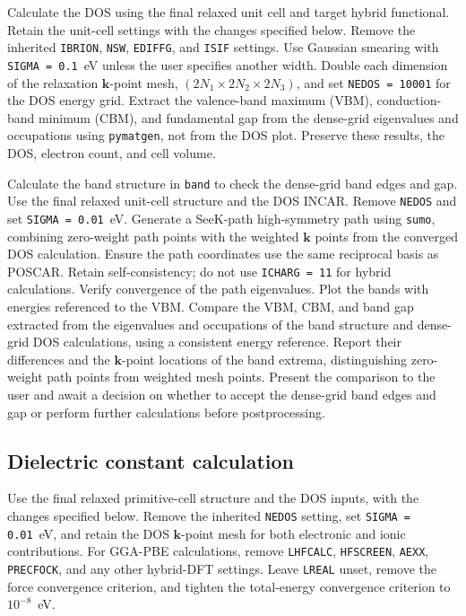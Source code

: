 \documentclass[aip,jap,reprint,amsmath,amssymb]{revtex4-2}
\begin{document}
Calculate the DOS using the final relaxed unit cell and target hybrid functional. Retain the unit-cell settings with the changes specified below. Remove the inherited \texttt{IBRION}, \texttt{NSW}, \texttt{EDIFFG}, and \texttt{ISIF} settings. Use Gaussian smearing with \texttt{SIGMA = 0.1}~eV unless the user specifies another width. Double each dimension of the relaxation $\bm{k}$-point mesh, $(2N_1\times2N_2\times2N_3)$, and set \texttt{NEDOS = 10001} for the DOS energy grid. Extract the valence-band maximum (VBM), conduction-band minimum (CBM), and fundamental gap from the dense-grid eigenvalues and occupations using \texttt{pymatgen}, not from the DOS plot. Preserve these results, the DOS, electron count, and cell volume.

Calculate the band structure in \texttt{band} to check the dense-grid band edges and gap. Use the final relaxed unit-cell structure and the DOS INCAR. Remove \texttt{NEDOS} and set \texttt{SIGMA = 0.01}~eV. Generate a SeeK-path high-symmetry path\cite{Hinuma2017} using \texttt{sumo},\cite{Ganose2018} combining zero-weight path points with the weighted $\bm{k}$ points from the converged DOS calculation. Ensure the path coordinates use the same reciprocal basis as POSCAR. Retain self-consistency; do not use \texttt{ICHARG = 11} for hybrid calculations. Verify convergence of the path eigenvalues. Plot the bands with energies referenced to the VBM. Compare the VBM, CBM, and band gap extracted from the eigenvalues and occupations of the band structure and dense-grid DOS calculations, using a consistent energy reference. Report their differences and the $\bm{k}$-point locations of the band extrema, distinguishing zero-weight path points from weighted mesh points. Present the comparison to the user and await a decision on whether to accept the dense-grid band edges and gap or perform further calculations before postprocessing.


\subsection{Dielectric constant calculation}\label{step:dielectric}

Use the final relaxed primitive-cell structure and the DOS inputs, with the changes specified below. Remove the inherited \texttt{NEDOS} setting, set \texttt{SIGMA = 0.01}~eV, and retain the DOS $\bm{k}$-point mesh for both electronic and ionic contributions. For GGA-PBE calculations, remove \texttt{LHFCALC}, \texttt{HFSCREEN}, \texttt{AEXX}, \texttt{PRECFOCK}, and any other hybrid-DFT settings. Leave \texttt{LREAL} unset, remove the force convergence criterion, and tighten the total-energy convergence criterion to $10^{-8}$~eV.
\end{document}
